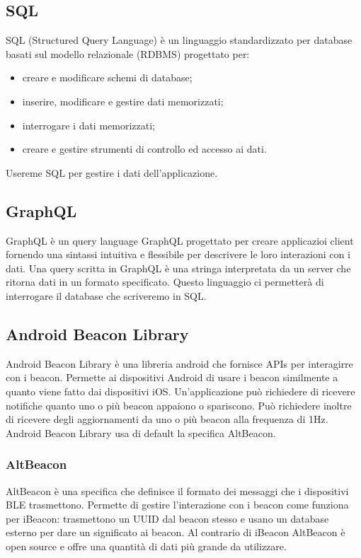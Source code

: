 \subsection{SQL}
	SQL (Structured Query Language) è un linguaggio standardizzato per database basati sul modello relazionale (RDBMS) progettato per:
	\begin{itemize}
		\item 	creare e modificare schemi di database;
		\item 	inserire, modificare e gestire dati memorizzati;
		\item 	interrogare i dati memorizzati;
		\item 	creare e gestire strumenti di controllo ed accesso ai dati.
	\end{itemize}
	Usereme SQL per gestire i dati dell'applicazione.
	
\subsection{GraphQL} 
	GraphQL è un query language GraphQL progettato per creare applicazioi client fornendo una sintassi intuitiva e flessibile per descrivere le loro interazioni con i dati. 
	Una query scritta in GraphQL è una stringa interpretata da un server che ritorna dati in un formato specificato. 
	Questo linguaggio ci permetterà di interrogare il database che scriveremo in SQL.

\subsection{Android Beacon Library}
	Android Beacon Library è una libreria android che fornisce APIs per interagirre con i beacon. Permette ai dispositivi Android di usare i beacon similmente a quanto viene fatto dai dispositivi iOS. Un'applicazione può richiedere di ricevere notifiche quanto uno o più beacon appaiono o spariscono. Può richiedere inoltre di ricevere degli aggiornamenti da uno o più beacon alla frequenza di 1Hz.
	Android Beacon Library usa di default la specifica AltBeacon.
	
\subsubsection{AltBeacon}
	AltBeacon è una specifica che definisce il formato dei messaggi che i dispositivi BLE trasmettono. Permette di gestire l'interazione con i beacon come funziona per iBeacon: trasmettono un UUID dal beacon stesso e usano un database esterno per dare un significato ai beacon.
	Al contrario di iBeacon AltBeacon è open source e offre una quantità di dati più grande da utilizzare.
	
	
	
	
	
